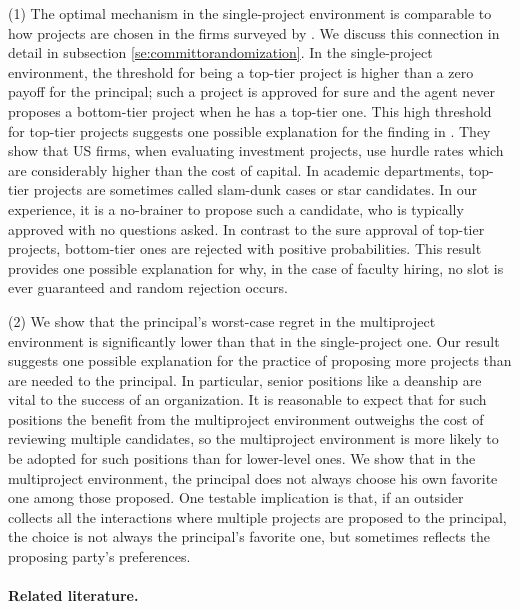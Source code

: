\documentclass[12pt,english]{article}
\theoremstyle{remark}
\theoremstyle{plain}
\theoremstyle{definition}
\begin{document}
(1) The optimal mechanism in the single-project environment is comparable to how projects are chosen in the firms surveyed by \cite{Ross1986}. We discuss this connection in detail in subsection \ref{se:committorandomization}.  In the single-project environment, the threshold for being a top-tier project is higher than a zero payoff for the principal; such a project is approved for sure and the agent never proposes a bottom-tier project when he has a top-tier one. This high threshold for top-tier projects suggests one possible explanation for the finding in \cite{PoterbaSummers1995}. They show that US firms, when evaluating investment projects, use hurdle rates which are considerably higher than the cost of capital. In academic departments, top-tier projects are sometimes called slam-dunk cases or star candidates. In our experience, it is a no-brainer to propose such a candidate, who is typically approved with no questions asked. In contrast to the sure approval of top-tier projects, bottom-tier ones are rejected with positive probabilities. This result provides one possible explanation for why, in the case of faculty hiring, no slot is ever guaranteed and random rejection occurs. 

(2) We show that the principal's worst-case regret in the multiproject environment is significantly lower than that in the single-project one. Our result suggests one possible explanation for the practice of proposing more projects than are needed to the principal. In particular, senior positions like a deanship are vital to the success of an organization. It is reasonable to expect that for such positions the benefit from the multiproject environment outweighs the cost of reviewing multiple candidates, so the multiproject environment is more likely to be adopted for such positions than for lower-level ones. We show that in the multiproject environment, the principal does not always choose his own favorite one among those proposed. One testable implication is that, if an outsider collects all the interactions where multiple projects are proposed to the principal, the choice is not always the principal's favorite one, but sometimes reflects the proposing party's preferences. 


\vspace{-5 mm}

\paragraph{Related literature.}
\end{document}
